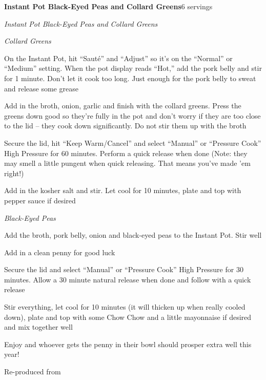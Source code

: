 \documentclass[../recipe-collections/cooking.tex]{subfiles}
\begin{document}
\begin{recipe}{\textbf{Instant Pot Black-Eyed Peas and Collard Greens}}{6 servings}{}

  \freeform{}\textit{Instant Pot Black-Eyed Peas and Collard Greens}

  \freeform{}\textit{Collard Greens}

  

  On the Instant Pot, hit “Sauté” and “Adjust” so it’s on the “Normal” or 
  “Medium” setting. When the pot display reads “Hot,” add the pork belly and 
  stir for 1 minute. Don’t let it cook too long. Just enough for the pork 
  belly to sweat and release some grease


  Add in the broth, onion, garlic and finish with the collard greens. Press 
  the greens down good so they’re fully in the pot and don’t worry if they are 
  too close to the lid – they cook down significantly. Do not stir them up 
  with the broth

  Secure the lid, hit “Keep Warm/Cancel” and select “Manual” or “Pressure 
  Cook” High Pressure for 60 minutes. Perform a quick release when done (Note: 
  they may smell a little pungent when quick releasing. That means you’ve 
  made ’em right!)

  Add in the kosher salt and stir. Let cool for 10 minutes, plate and 
  top with pepper sauce if desired

  \freeform{}\textit{Black-Eyed Peas}


  Add the broth, pork belly, onion and black-eyed peas to the Instant Pot. 
  Stir well

  Add in a clean penny for good luck

  Secure the lid and select “Manual” or “Pressure Cook” High Pressure for 30 
  minutes. Allow a 30 minute natural release when done and follow with a 
  quick release

  Stir everything, let cool for 10 minutes (it will thicken up when really 
  cooled down), plate and top with some Chow Chow and a little mayonnaise if 
  desired and mix together well

  Enjoy and whoever gets the penny in their bowl should prosper extra well 
  this year!

\end{recipe}

Re-produced from  \autocite{PressureLuck_BlackEyedPeasAndGreens_2017}
\end{document}
